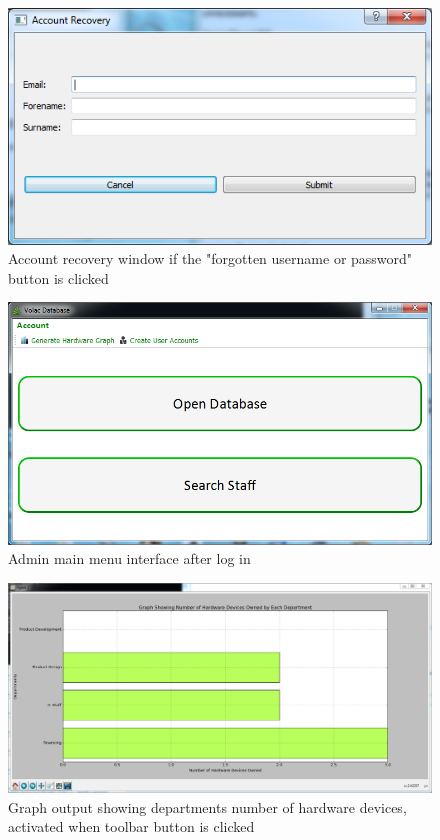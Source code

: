 \begin{figure}[H]
    \includegraphics[width=\textwidth]{./Maintenance/Images/AccountRecovery.png}
    \caption{Account recovery window if the "forgotten username or password" button is clicked} \label{fig:AccountRecovery}
\end{figure}

\begin{figure}[H]
    \includegraphics[width=\textwidth]{./Maintenance/Images/adminmainmenu.png}
    \caption{Admin main menu interface after log in} \label{fig:adminmainmenu}
\end{figure}

\begin{figure}[H]
    \includegraphics[width=\textwidth]{./Maintenance/Images/graph.png}
    \caption{Graph output showing departments number of hardware devices, activated when toolbar button is clicked} \label{fig:graph}
\end{figure}

